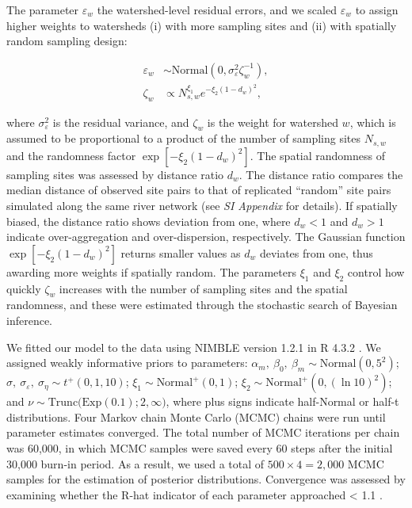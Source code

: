 \documentclass[11pt, class=article, crop=false]{standalone}
\begin{document}
The parameter $\varepsilon_w$ the watershed-level residual errors, and we scaled $\varepsilon_w$ to assign higher weights to watersheds (i) with more sampling sites and (ii) with spatially random sampling design:

\begin{align}
    \varepsilon_w &\sim \mbox{Normal}(0, \sigma_{\varepsilon}^2 \zeta_w^{-1}),\\
    \zeta_w &\propto N_{s, w}^{\xi_1} e^{-\xi_2 (1 - d_{w})^2},
\end{align}

where $\sigma_{\varepsilon}^2$ is the residual variance, and $\zeta_w$ is the weight for watershed $w$, which is assumed to be proportional to a product of the number of sampling sites $N_{s,w}$ and the randomness factor $\exp[-\xi_2 (1 - d_{w})^2]$.
The spatial randomness of sampling sites was assessed by distance ratio $d_{w}$.
The distance ratio compares the median distance of observed site pairs to that of replicated ``random'' site pairs simulated along the same river network (see \textit{SI Appendix} for details).
If spatially biased, the distance ratio shows deviation from one, where $d_{w} < 1$ and $d_{w} > 1$ indicate over-aggregation and over-dispersion, respectively.
The Gaussian function $\exp[-\xi_2 (1 - d_{w})^2]$ returns smaller values as $d_{w}$ deviates from one, thus awarding more weights if spatially random.
The parameters $\xi_1$ and $\xi_2$ control how quickly $\zeta_w$ increases with the number of sampling sites and the spatial randomness, and these were estimated through the stochastic search of Bayesian inference.

We fitted our model to the data using NIMBLE version 1.2.1 \citep{nimble, pkg_nimble} in R 4.3.2 \citep{r_program}.
We assigned weakly informative priors to parameters: $\alpha_m,~\beta_0,~\beta_m \sim \mbox{Normal}(0, 5^2)$; $\sigma,~\sigma_{\varepsilon},~\sigma_{\eta} \sim t^+(0, 1, 10)$; $\xi_1 \sim \mbox{Normal}^+(0, 1)$; $\xi_2 \sim \mbox{Normal}^+(0, (\ln 10)^2)$; and $\nu \sim \mbox{Trunc(Exp}(0.1); 2, \infty)$, where plus signs indicate half-Normal or half-t distributions. 
Four Markov chain Monte Carlo (MCMC) chains were run until parameter estimates
converged.
The total number of MCMC iterations per chain was 60,000, in which MCMC samples were saved every 60 steps after the initial 30,000 burn-in period.
As a result, we used a total of $500 \times 4 = 2,000$ MCMC samples for the estimation of posterior distributions.
Convergence was assessed by examining whether the R-hat indicator of each parameter approached < 1.1 \citep{gelman2013bayesian}.
\end{document}
